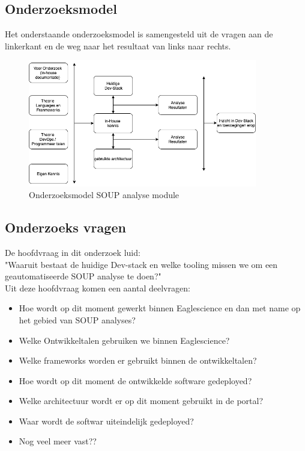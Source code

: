 \subsection{Onderzoeksmodel}\label{subsec:onderzoeksmodel}
Het onderstaande onderzoeksmodel is samengesteld uit de vragen aan de linkerkant en de weg naar het resultaat van links naar rechts.\\
\begin{figure}[h!]
\myfloatalign
\includegraphics[width=10cm]{gfx/OnderzoeksmodelES}
\caption{Onderzoeksmodel SOUP analyse module}
\label{fig:Onderzoeks model Dev-Stack}
\end{figure}

\subsection{Onderzoeks vragen}\label{subsec:onderzoeks-vragen}
De hoofdvraag in dit onderzoek luid: \\
"Waaruit bestaat de huidige Dev-stack en welke tooling missen we om een geautomatiseerde SOUP analyse te doen?"\\
Uit deze hoofdvraag komen een aantal deelvragen:

\begin{itemize}
  \item Hoe wordt op dit moment gewerkt binnen Eaglescience en dan met name op het gebied van SOUP analyses?
  \item Welke Ontwikkeltalen gebruiken we binnen Eaglescience?
  \item Welke frameworks worden er gebruikt binnen de ontwikkeltalen?
  \item Hoe wordt op dit moment de ontwikkelde software gedeployed?
  \item Welke architectuur wordt er op dit moment gebruikt in de portal?
  \item Waar wordt de softwar uiteindelijk gedeployed?
  \item Nog veel meer vast??
\end{itemize}

